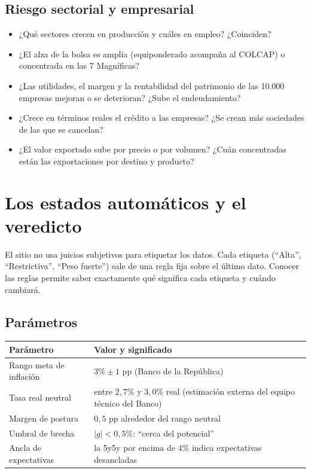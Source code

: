 \section{Riesgo sectorial y empresarial}
\begin{itemize}
\item ¿Qué sectores crecen en producción y cuáles en empleo? ¿Coinciden?
\item ¿El alza de la bolsa es amplia (equiponderado acompaña al COLCAP) o concentrada en las 7 Magníficas?
\item ¿Las utilidades, el margen y la rentabilidad del patrimonio de las 10.000 empresas mejoran o se deterioran?
  ¿Sube el endeudamiento?
\item ¿Crece en términos reales el crédito a las empresas? ¿Se crean más sociedades de las que se cancelan?
\item ¿El valor exportado sube por precio o por volumen? ¿Cuán concentradas están las exportaciones por destino y
  producto?
\end{itemize}

\chapter{Los estados automáticos y el veredicto}
\label{es:i:estados}

El sitio no usa juicios subjetivos para etiquetar los datos. Cada etiqueta (``Alta'', ``Restrictiva'', ``Peso
fuerte'') sale de una regla fija sobre el último dato. Conocer las reglas permite saber exactamente qué significa
cada etiqueta y cuándo cambiará.

\section{Parámetros}
\begin{center}
\small
\begin{tabularx}{\linewidth}{lX}
\toprule
\textbf{Parámetro} & \textbf{Valor y significado}\\
\midrule
Rango meta de inflación & $3\% \pm 1$ pp (Banco de la República)\\
Tasa real neutral & entre $2{,}7\%$ y $3{,}0\%$ real (estimación externa del equipo técnico del Banco)\\
Margen de postura & $0{,}5$ pp alrededor del rango neutral\\
Umbral de brecha & $\lvert g\rvert<0{,}5\%$: ``cerca del potencial''\\
Ancla de expectativas & la 5y5y por encima de $4\%$ indica expectativas desancladas\\
\bottomrule
\end{tabularx}
\end{center}

